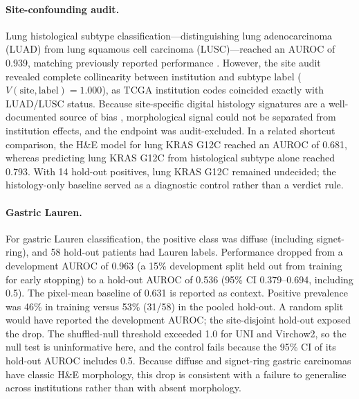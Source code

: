 \documentclass[a4paper,10pt,twocolumn]{extarticle}
\begin{document}
\paragraph{Site-confounding audit.} Lung histological subtype classification—distinguishing lung adenocarcinoma (LUAD) from lung squamous cell carcinoma (LUSC)—reached an AUROC of 0.939, matching previously reported performance \cite{coudray2018}. However, the site audit revealed complete collinearity between institution and subtype label ($V(\mathrm{site},\mathrm{label}) = 1.000$), as TCGA institution codes coincided exactly with LUAD/LUSC status. Because site-specific digital histology signatures are a well-documented source of bias \cite{howard2021}, morphological signal could not be separated from institution effects, and the endpoint was audit-excluded. In a related shortcut comparison, the H\&E model for lung KRAS G12C reached an AUROC of 0.681, whereas predicting lung KRAS G12C from histological subtype alone reached 0.793. With 14 hold-out positives, lung KRAS G12C remained undecided; the histology-only baseline served as a diagnostic control rather than a verdict rule.

\paragraph{Gastric Lauren.} For gastric Lauren classification, the positive class was diffuse (including signet-ring), and 58 hold-out patients had Lauren labels. Performance dropped from a development AUROC of 0.963 (a 15\% development split held out from training for early stopping) to a hold-out AUROC of 0.536 (95\% CI 0.379--0.694, including 0.5). The pixel-mean baseline of 0.631 is reported as context. Positive prevalence was 46\% in training versus 53\% (31/58) in the pooled hold-out. A random split would have reported the development AUROC; the site-disjoint hold-out exposed the drop. The shuffled-null threshold exceeded 1.0 for UNI and Virchow2, so the null test is uninformative here, and the control fails because the 95\% CI of its hold-out AUROC includes 0.5. Because diffuse and signet-ring gastric carcinomas have classic H\&E morphology, this drop is consistent with a failure to generalise across institutions rather than with absent morphology.
\end{document}
